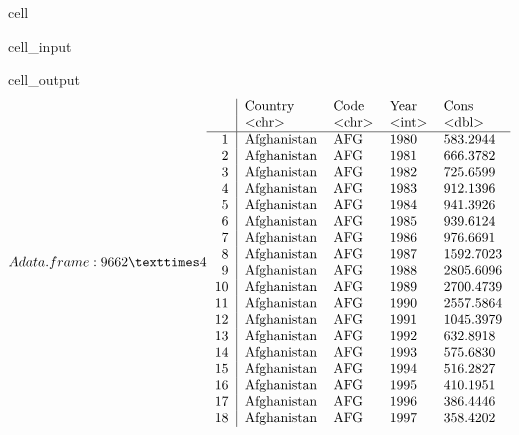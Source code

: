 \documentclass[letterpaper,10pt,english]{jupyterBook}
\begin{document}
\begin{sphinxuseclass}{cell}\begin{sphinxVerbatimInput}

\begin{sphinxuseclass}{cell_input}
\begin{sphinxVerbatim}[commandchars=\\\{\}]
\end{sphinxVerbatim}

\end{sphinxuseclass}\end{sphinxVerbatimInput}
\begin{sphinxVerbatimOutput}

\begin{sphinxuseclass}{cell_output}\begin{equation*}
\begin{split}A data.frame: 9662 × 4
\begin{tabular}{r|llll}
  & Country & Code & Year & Cons\\
  & <chr> & <chr> & <int> & <dbl>\\
\hline
	1 & Afghanistan & AFG & 1980 &  583.2944\\
	2 & Afghanistan & AFG & 1981 &  666.3782\\
	3 & Afghanistan & AFG & 1982 &  725.6599\\
	4 & Afghanistan & AFG & 1983 &  912.1396\\
	5 & Afghanistan & AFG & 1984 &  941.3926\\
	6 & Afghanistan & AFG & 1985 &  939.6124\\
	7 & Afghanistan & AFG & 1986 &  976.6691\\
	8 & Afghanistan & AFG & 1987 & 1592.7023\\
	9 & Afghanistan & AFG & 1988 & 2805.6096\\
	10 & Afghanistan & AFG & 1989 & 2700.4739\\
	11 & Afghanistan & AFG & 1990 & 2557.5864\\
	12 & Afghanistan & AFG & 1991 & 1045.3979\\
	13 & Afghanistan & AFG & 1992 &  632.8918\\
	14 & Afghanistan & AFG & 1993 &  575.6830\\
	15 & Afghanistan & AFG & 1994 &  516.2827\\
	16 & Afghanistan & AFG & 1995 &  410.1951\\
	17 & Afghanistan & AFG & 1996 &  386.4446\\
	18 & Afghanistan & AFG & 1997 &  358.4202\\

\end{tabular}
\end{split}
\end{equation*}
\end{sphinxuseclass}
\end{sphinxVerbatimOutput}
\end{sphinxuseclass}
\end{document}
